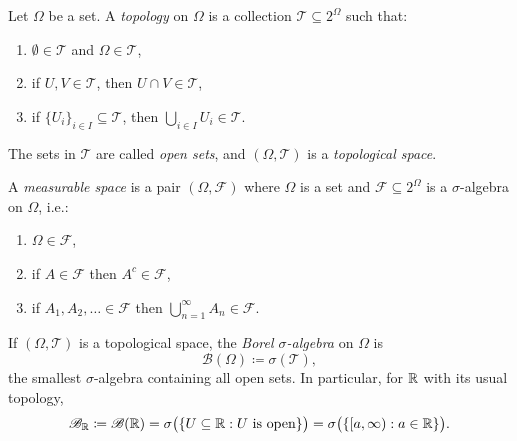 \begin{definition}[Topology]
	Let $\Omega$ be a set. A \emph{topology} on $\Omega$ is a collection $\mathcal{T}\subseteq 2^\Omega$ such that:
	\begin{enumerate}[label=(\roman*)]
		\item $\emptyset\in\mathcal{T}$ and $\Omega\in\mathcal{T}$,
		\item if $U,V\in\mathcal{T}$, then $U\cap V\in\mathcal{T}$,
		\item if $\{U_i\}_{i\in I}\subseteq\mathcal{T}$, then $\bigcup_{i\in I}U_i\in\mathcal{T}$.
	\end{enumerate}
	The sets in $\mathcal{T}$ are called \emph{open sets}, and $(\Omega,\mathcal{T})$ is a \emph{topological space}.
\end{definition}

\begin{definition}
	A \emph{measurable space} is a pair $(\Omega,\mathscr{F})$ where $\Omega$ is a set and $\mathscr{F}\subseteq 2^\Omega$ is a $\sigma$-algebra on $\Omega$, i.e.:
	\begin{enumerate}[label=(\roman*)]
		\item $\Omega\in\mathscr{F}$,
		\item if $A\in\mathscr{F}$ then $A^c\in\mathscr{F}$,
		\item if $A_1,A_2,\ldots\in\mathscr{F}$ then $\bigcup_{n=1}^\infty A_n\in\mathscr{F}$.
	\end{enumerate}
\end{definition}

\begin{definition}
	If $(\Omega,\mathcal{T})$ is a topological space, the \emph{Borel $\sigma$-algebra} on $\Omega$ is
	\[
	\mathscr{B}(\Omega) \coloneqq \sigma(\mathcal{T}),
	\]
	the smallest $\sigma$-algebra containing all open sets.
	In particular, for $\mathbb{R}$ with its usual topology,
	\[
	\mathscr{B}_{\mathbb{R}} \coloneqq \mathscr{B}(\mathbb{R})=\sigma\big(\{U\subseteq \mathbb{R} : U \text{ is open}\}\big)
	=\sigma\big(\{[a,\infty): a \in \mathbb{R}\}\big).
	\]
\end{definition}

